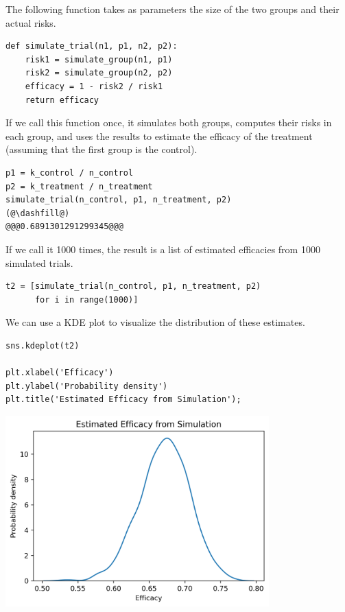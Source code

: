 The following function takes as parameters the size of the two groups
and their actual risks.

\begin{lstlisting}[]
def simulate_trial(n1, p1, n2, p2):
    risk1 = simulate_group(n1, p1)
    risk2 = simulate_group(n2, p2)
    efficacy = 1 - risk2 / risk1
    return efficacy
\end{lstlisting}

If we call this function once, it simulates both groups, computes their
risks in each group, and uses the results to estimate the efficacy of
the treatment (assuming that the first group is the control).

\begin{lstlisting}[]
p1 = k_control / n_control
p2 = k_treatment / n_treatment
simulate_trial(n_control, p1, n_treatment, p2)
(@\dashfill@)
@@@0.6891301291299345@@@
\end{lstlisting}

If we call it 1000 times, the result is a list of estimated efficacies
from 1000 simulated trials.

\begin{lstlisting}[]
t2 = [simulate_trial(n_control, p1, n_treatment, p2)
      for i in range(1000)]
\end{lstlisting}

We can use a KDE plot to visualize the distribution of these estimates.

\begin{lstlisting}[]
sns.kdeplot(t2)

plt.xlabel('Efficacy')
plt.ylabel('Probability density')
plt.title('Estimated Efficacy from Simulation');
\end{lstlisting}

\begin{center}
\includegraphics[width=4in]{11_resampling_files/11_resampling_45_0.png}
\end{center}

